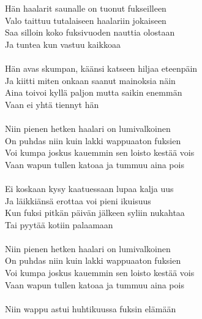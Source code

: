 
            Hän haalarit saunalle on tuonut fukseilleen \\
            Valo taittuu tutalaiseen haalariin jokaiseen \\
            Saa silloin koko fuksivuoden nauttia olostaan \\
            Ja tuntea kun vastuu kaikkoaa \\
\hspace{10mm} \\
            Hän avas skumpan, käänsi katseen hiljaa eteenpäin \\
            Ja kiitti miten onkaan saanut mainoksia näin \\
            Aina toivoi kyllä paljon mutta saikin enemmän \\
            Vaan ei yhtä tiennyt hän \\
\hspace{10mm} \\
            Niin pienen hetken haalari on lumivalkoinen \\
            On puhdas niin kuin lakki wappuaaton fuksien \\
            Voi kumpa joskus kauemmin sen loisto kestää vois \\
            Vaan wapun tullen katoaa ja tummuu aina pois \\
\hspace{10mm} \\
            Ei koskaan kysy kaatuessaan lupaa kalja uus \\
            Ja läikkiänsä erottaa voi pieni ikuisuus \\
            Kun fuksi pitkän päivän jälkeen syliin nukahtaa \\
            Tai pyytää kotiin palaamaan \\
\hspace{10mm} \\
            Niin pienen hetken haalari on lumivalkoinen \\
            On puhdas niin kuin lakki wappuaaton fuksien \\
            Voi kumpa joskus kauemmin sen loisto kestää vois \\
            Vaan wapun tullen katoaa ja tummuu aina pois \\
\hspace{10mm} \\
            Niin wappu astui huhtikuussa fuksin elämään \\
